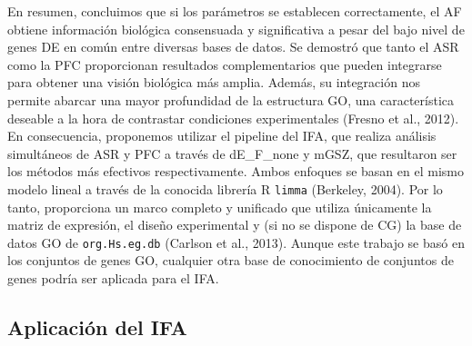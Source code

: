 \documentclass[12pt,twoside]{reedthesis}
\begin{document}
\par

En resumen, concluimos que si los parámetros se establecen correctamente, el AF obtiene información biológica consensuada y significativa a pesar del bajo nivel de genes DE en común entre diversas bases de datos. Se demostró que tanto el ASR como la PFC proporcionan resultados complementarios que pueden integrarse para obtener una visión biológica más amplia. Además, su integración nos permite abarcar una mayor profundidad de la estructura GO, una característica deseable a la hora de contrastar condiciones experimentales (Fresno et al., 2012). En consecuencia, proponemos utilizar el pipeline del IFA, que realiza análisis simultáneos de ASR y PFC a través de dE\_F\_none y mGSZ, que resultaron ser los métodos más efectivos respectivamente. Ambos enfoques se basan en el mismo modelo lineal a través de la conocida librería R \texttt{limma} (Berkeley, 2004). Por lo tanto, proporciona un marco completo y unificado que utiliza únicamente la matriz de expresión, el diseño experimental y (si no se dispone de CG) la base de datos GO de \texttt{org.Hs.eg.db} (Carlson et al., 2013). Aunque este trabajo se basó en los conjuntos de genes GO, cualquier otra base de conocimiento de conjuntos de genes podría ser aplicada para el IFA.

\hypertarget{aplicaciuxf3n-del-ifa}{%
\subsection{Aplicación del IFA}\label{aplicaciuxf3n-del-ifa}}

\par
\end{document}
